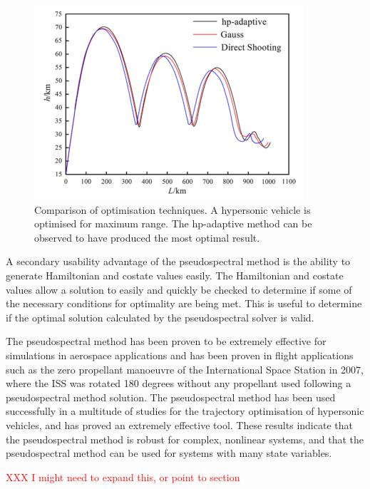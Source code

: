 \begin{figure}[ht]
	\centering
	\includegraphics[width=0.7\linewidth]{figures/2_literature-review/OptimisationMethodComparisonChai}
	\caption{Comparison of optimisation techniques\cite{Chai2015}. A hypersonic vehicle is optimised for maximum range. The \textsf{hp}-adaptive method can be observed to have produced the most optimal result.}
	\label{fig:OptimisationMethodComparisonChai}
\end{figure}

A secondary usability advantage of the pseudospectral method is the ability to generate Hamiltonian and costate values easily\cite{Gong2010,Fahroo2001,Rao2009}. The Hamiltonian and costate values allow a solution to easily and quickly be checked to determine if some of the necessary conditions for optimality are being met. This is useful to determine if the optimal solution calculated by the pseudospectral solver is valid.


The pseudospectral method has been proven to be extremely effective for simulations in aerospace applications and has been proven in flight applications such as the zero propellant manoeuvre of the International Space Station in 2007, where the ISS was rotated 180 degrees without any propellant used following a pseudospectral method solution\cite{Bedrossian}. 
The pseudospectral method has been used successfully in a multitude of studies for the trajectory optimisation of hypersonic vehicles\cite{Li2012,Josselyn2002a,Zhao2013,Tian2011,Darby2011,Chai2015,Rizvi2015,Moshman2014,Yang2017,Kodera2014}, and has proved an extremely effective tool. 
These results indicate that the pseudospectral method is robust for complex, nonlinear systems, and that the pseudospectral method can be used for systems with many state variables.

\textcolor{red}{XXX I might need to expand this, or point to section}

